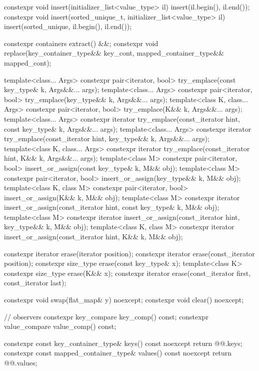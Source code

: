 \begin{codeblock}
{{    constexpr void insert(initializer_list<value_type> il)
      { insert(il.begin(), il.end()); }
    constexpr void insert(sorted_unique_t, initializer_list<value_type> il)
      { insert(sorted_unique, il.begin(), il.end()); }

    constexpr containers extract() &&;
    constexpr void replace(key_container_type&& key_cont, mapped_container_type&& mapped_cont);

    template<class... Args>
      constexpr pair<iterator, bool> try_emplace(const key_type& k, Args&&... args);
    template<class... Args>
      constexpr pair<iterator, bool> try_emplace(key_type&& k, Args&&... args);
    template<class K, class... Args>
      constexpr pair<iterator, bool> try_emplace(K&& k, Args&&... args);
    template<class... Args>
      constexpr iterator try_emplace(const_iterator hint, const key_type& k, Args&&... args);
    template<class... Args>
      constexpr iterator try_emplace(const_iterator hint, key_type&& k, Args&&... args);
    template<class K, class... Args>
      constexpr iterator try_emplace(const_iterator hint, K&& k, Args&&... args);
    template<class M>
      constexpr pair<iterator, bool> insert_or_assign(const key_type& k, M&& obj);
    template<class M>
      constexpr pair<iterator, bool> insert_or_assign(key_type&& k, M&& obj);
    template<class K, class M>
      constexpr pair<iterator, bool> insert_or_assign(K&& k, M&& obj);
    template<class M>
      constexpr iterator insert_or_assign(const_iterator hint, const key_type& k, M&& obj);
    template<class M>
      constexpr iterator insert_or_assign(const_iterator hint, key_type&& k, M&& obj);
    template<class K, class M>
      constexpr iterator insert_or_assign(const_iterator hint, K&& k, M&& obj);

    constexpr iterator erase(iterator position);
    constexpr iterator erase(const_iterator position);
    constexpr size_type erase(const key_type& x);
    template<class K> constexpr size_type erase(K&& x);
    constexpr iterator erase(const_iterator first, const_iterator last);

    constexpr void swap(flat_map& y) noexcept;
    constexpr void clear() noexcept;

    // observers
    constexpr key_compare key_comp() const;
    constexpr value_compare value_comp() const;

    constexpr const key_container_type& keys() const noexcept      { return @@.keys; }
    constexpr const mapped_container_type& values() const noexcept { return @@.values; }

}}
\end{codeblock}
